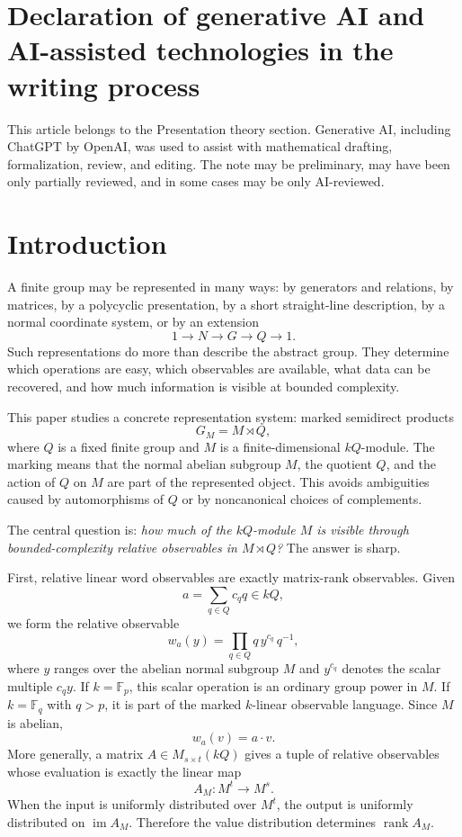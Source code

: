 \documentclass[11pt]{article}
\begin{document}
\section*{Declaration of generative AI and AI-assisted technologies in the writing process}
This article belongs to the Presentation theory section. Generative AI, including ChatGPT by \mbox{OpenAI}, was used to assist with mathematical drafting, formalization, review, and editing. The note may be preliminary, may have been only partially reviewed, and in some cases may be only AI-reviewed.

\section{Introduction}

A finite group may be represented in many ways: by generators and relations, by matrices, by a polycyclic presentation, by a short straight-line description, by a normal coordinate system, or by an extension
\[
1\to N\to G\to Q\to 1.
\]
Such representations do more than describe the abstract group. They determine which operations are easy, which observables are available, what data can be recovered, and how much information is visible at bounded complexity.

This paper studies a concrete representation system: marked semidirect products
\[
G_M=M\rtimes Q,
\]
where $Q$ is a fixed finite group and $M$ is a finite-dimensional $kQ$-module. The marking means that the normal abelian subgroup $M$, the quotient $Q$, and the action of $Q$ on $M$ are part of the represented object. This avoids ambiguities caused by automorphisms of $Q$ or by noncanonical choices of complements.

The central question is: \emph{how much of the $kQ$-module $M$ is visible through bounded-complexity relative observables in $M\rtimes Q$?}
The answer is sharp.

First, relative linear word observables are exactly matrix-rank observables. Given
\[
a=\sum_{q\in Q} c_q q\in kQ,
\]
we form the relative observable
\[
w_a(y)=\prod_{q\in Q} q\, y^{c_q}\, q^{-1},
\]
where $y$ ranges over the abelian normal subgroup $M$ and $y^{c_q}$ denotes the scalar multiple $c_qy$. If $k=\mathbb F_p$, this scalar operation is an ordinary group power in $M$. If $k=\mathbb F_q$ with $q>p$, it is part of the marked $k$-linear observable language. Since $M$ is abelian,
\[
w_a(v)=a\cdot v.
\]
More generally, a matrix $A\in M_{s\times t}(kQ)$ gives a tuple of relative observables whose evaluation is exactly the linear map
\[
A_M:M^t\to M^s.
\]
When the input is uniformly distributed over $M^t$, the output is uniformly distributed on $\operatorname{im}A_M$. Therefore the value distribution determines $\operatorname{rank}A_M$.
\end{document}
